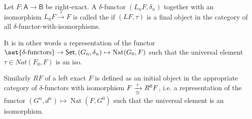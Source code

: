 \documentclass[fontsize=11pt,fleqn,a4paper]{scrartcl}
\begin{document}
\begin{definition}
Let $F: \mathsf{A} \to \mathsf{B}$ be right-exact. A $\delta$-functor $(L_nF,\delta_n)$ together with an isomorphism $L_0 F \xrightarrow{\tau} F$ is called the  if $(LF,\tau)$ is a final object in the category of all $\delta$-functor-with-isomorphisms.

It is in other words a representation of the functor $\set{\delta\text{-functors}} \to \mathsf{Set}, (G_n,\delta_n)\mapsto \operatorname{Nat}(G_0,F)$ such that the universal element $\tau\in Nat(F_0,F)$ is an iso.

\medbreak
Similarly  $RF$ of a left exact $F$ is defined as an initial object in the appropriate category of $\delta$-functors with isomorphism $F\xrightarrow[\cong]{\tau} R^0 F$, i.e. a representation of the functor $(G^n,d^n) \mapsto \operatorname{Nat}(F,G^0)$ such that the universal element is an isomorphism.
\end{definition}
\end{document}
